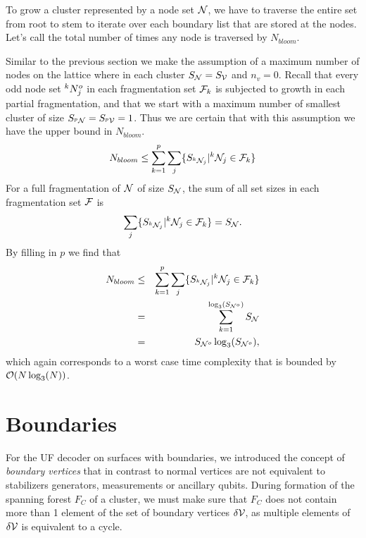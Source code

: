 To grow a cluster represented by a node set $\mathcal{N}$, we have to traverse the entire set from root to stem to iterate over each boundary list that are stored at the nodes. Let's call the total number of times any node is traversed by  $N_{bloom}$.

Similar to the previous section we make the assumption of a maximum number of nodes on the lattice where in each cluster $S_{\mathcal{N}} = S_{\mathcal{V}}$ and $n_v = 0$. Recall that every odd node set ${}^{k}N^o_j$ in each fragmentation set $\mathcal{F}_k$ is subjected to growth in each partial fragmentation, and that we start with a maximum number of smallest cluster of size $S_{{}^{p}\mathcal{N}} = S_{{}^{p}\mathcal{V}} = 1$. Thus we are certain that with this assumption we have the upper bound in $N_{bloom}$.
\begin{equation}\label{eq:nnode}
  N_{bloom} \leq \sum^{p}_{k=1}\sum_j \{ S_{{}^{k}\mathcal{N}_j} | {}^{k}\mathcal{N}_j \in \mathcal{F}_k \}
\end{equation}
For a full fragmentation of $\mathcal{N}$ of size $S_{\mathcal{N}}$, the sum of all set sizes in each fragmentation set $\mathcal{F}$ is
\begin{equation}\label{eq:sumsetsfrag}
  \sum_j \{S_{{}^{k}\mathcal{N}_j} | {}^{k}\mathcal{N}_j \in \mathcal{F}_k \} = S_{\mathcal{N}}.
\end{equation}
By filling in $p$ we find that
\begin{eqnarray}
  \nonumber N_{bloom} &\leq& \sum^{p}_{k=1}\sum_j \{ S_{{}^{k}\mathcal{N}_j} | {}^{k}\mathcal{N}_j \in \mathcal{F}_k \} \\
  \nonumber &=& \sum_{k=1}^{\log_3(S_{\mathcal{N}^o})} S_{\mathcal{N}} \\
   &=& S_{\mathcal{N}^o}\log_3(S_{\mathcal{N}^o}),
\end{eqnarray}
which again corresponds to a worst case time complexity that is bounded by $\mathcal{O}(N\log_3(N))$.

\section{Boundaries}
For the UF decoder on surfaces with boundaries, we introduced the concept of \emph{boundary vertices} that in contrast to normal vertices are not equivalent to stabilizers generators, measurements or ancillary qubits. During formation of the spanning forest $F_C$ of a cluster, we must make sure that $F_C$ does not contain more than 1 element of the set of boundary vertices $\delta\mathcal{V}$, as multiple elements of $\delta\mathcal{V}$ is equivalent to a cycle.

